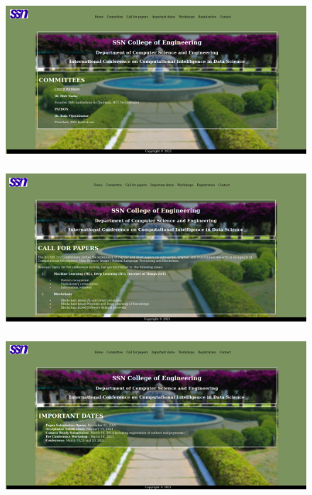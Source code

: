 \documentclass[12pt,letterpaper]{article}
\begin{document}
\newpage
\subsubsection*{}
\begin{figure}[h]
    \centering
    \includegraphics[width = \textwidth]{Pics/Committee.png}
\end{figure}

\newpage
\subsubsection*{}
\begin{figure}[h]
    \centering
    \includegraphics[width = \textwidth]{Pics/Papers.png}
\end{figure}

\newpage
\subsubsection*{}
\begin{figure}[h]
    \centering
    \includegraphics[width = \textwidth]{Pics/Dates.png}
\end{figure}
\end{document}
